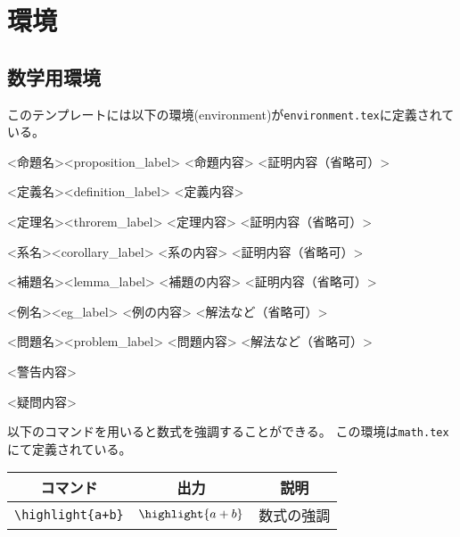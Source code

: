 \chapter{環境}

\section{数学用環境}

このテンプレートには以下の環境(environment)が\verb|environment.tex|に定義されている。

\begin{proposition}{<命題名>}{<proposition_label>}
    <命題内容>
    \tcblower
    <証明内容（省略可）>
\end{proposition}

\begin{definition}{<定義名>}{<definition_label>}
    <定義内容>
\end{definition}

\begin{theorem}{<定理名>}{<throrem_label>}
    <定理内容>
    \tcblower
    <証明内容（省略可）>
\end{theorem}

\begin{corollary}{<系名>}{<corollary_label>}
    <系の内容>
    \tcblower
    <証明内容（省略可）>
\end{corollary}

\begin{lemma}{<補題名>}{<lemma_label>}
    <補題の内容>
    \tcblower
    <証明内容（省略可）>
\end{lemma}

\begin{eg}{<例名>}{<eg_label>}
    <例の内容>
    \tcblower
    <解法など（省略可）>
\end{eg}

\begin{problem}{<問題名>}{<problem_label>}
<問題内容>
\tcblower
<解法など（省略可）>
\end{problem}

\begin{warning}
    <警告内容>
\end{warning}

\begin{question}
    <疑問内容>
\end{question}

以下のコマンドを用いると数式を強調することができる。
この環境は\verb|math.tex|にて定義されている。

\begin{longtable}{ccc}
    \toprule
    コマンド               & 出力                              & 説明       \\
    \midrule
    \verb|\highlight{a+b}| & \(\displaystyle \highlight{a+b}\) & 数式の強調 \\
    \bottomrule
\end{longtable}